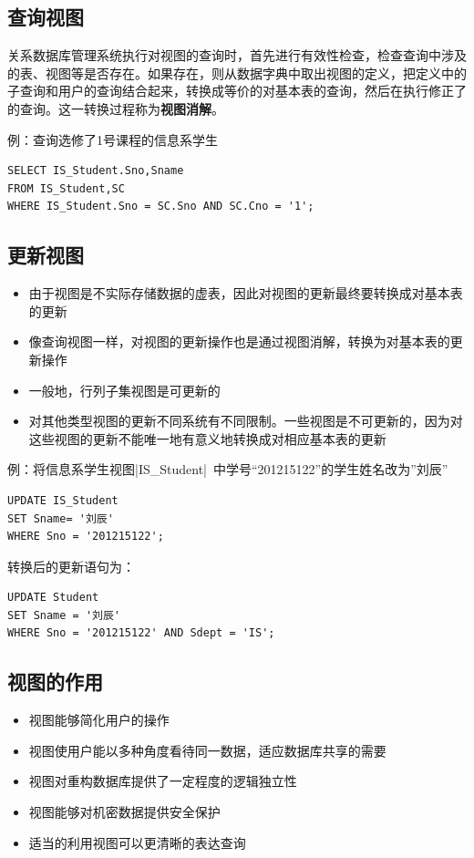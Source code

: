 \subsection{查询视图}
关系数据库管理系统执行对视图的查询时，首先进行有效性检查，检查查询中涉及的表、视图等是否存在。如果存在，则从数据字典中取出视图的定义，把定义中的子查询和用户的查询结合起来，转换成等价的对基本表的查询，然后在执行修正了的查询。这一转换过程称为\textbf{视图消解}。

例：查询选修了1号课程的信息系学生
\begin{lstlisting}
SELECT IS_Student.Sno,Sname
FROM IS_Student,SC
WHERE IS_Student.Sno = SC.Sno AND SC.Cno = '1';
\end{lstlisting}

\subsection{更新视图}
\begin{itemize}
    \item 由于视图是不实际存储数据的虚表，因此对视图的更新最终要转换成对基本表的更新
    \item 像查询视图一样，对视图的更新操作也是通过视图消解，转换为对基本表的更新操作
    \item 一般地，行列子集视图是可更新的
    \item 对其他类型视图的更新不同系统有不同限制。一些视图是不可更新的，因为对这些视图的更新不能唯一地有意义地转换成对相应基本表的更新
\end{itemize}

例：将信息系学生视图\sverb|IS_Student|\ 中学号“201215122”的学生姓名改为”刘辰”
\begin{lstlisting}
UPDATE IS_Student
SET Sname= '刘辰'
WHERE Sno = '201215122';
\end{lstlisting}

转换后的更新语句为：
\begin{lstlisting}
UPDATE Student
SET Sname = '刘辰'
WHERE Sno = '201215122' AND Sdept = 'IS';
\end{lstlisting}

\subsection{视图的作用}
\begin{itemize}
    \item 视图能够简化用户的操作
    \item 视图使用户能以多种角度看待同一数据，适应数据库共享的需要
    \item 视图对重构数据库提供了一定程度的逻辑独立性
    \item 视图能够对机密数据提供安全保护
    \item 适当的利用视图可以更清晰的表达查询
\end{itemize}